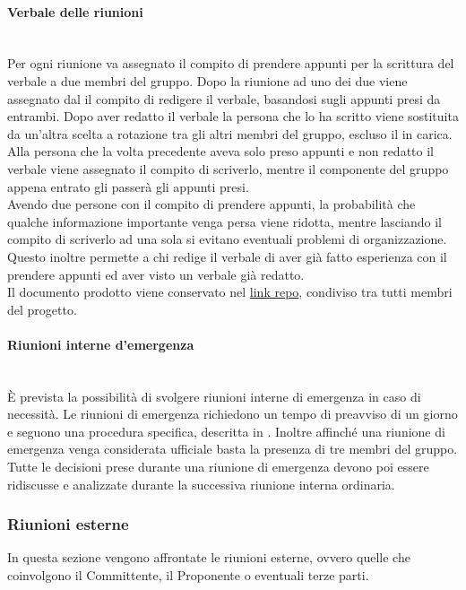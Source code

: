 \paragraph{Verbale delle riunioni}\label{sec:verbale_riunioni_interne}\mbox{}\\
Per ogni riunione va assegnato il compito di prendere appunti per la scrittura del verbale a due membri del gruppo. Dopo la riunione ad uno dei due viene assegnato dal \Responsabile{} il compito di redigere il verbale, basandosi sugli appunti presi da entrambi. 
Dopo aver redatto il verbale la persona che lo ha scritto viene sostituita da un’altra scelta a rotazione tra gli altri membri del gruppo, escluso il \Responsabile{} in carica. Alla persona che la volta precedente aveva solo preso appunti e non redatto il verbale viene assegnato il compito di scriverlo, mentre il componente del gruppo appena entrato gli passerà gli appunti presi.\\
Avendo due persone con il compito di prendere appunti, la probabilità che qualche informazione importante venga persa viene ridotta, mentre lasciando il compito di scriverlo ad una sola si evitano eventuali problemi di organizzazione.
Questo inoltre permette a chi redige il verbale di aver già fatto esperienza con il prendere appunti ed aver visto un verbale già redatto.\\
Il documento prodotto viene conservato nel  \url{link repo}, condiviso tra tutti membri del progetto.

\paragraph{Riunioni interne d'emergenza}\label{sec:riunioni_emergenza}\mbox{}\\
\`{E} prevista la possibilità di svolgere riunioni interne di emergenza in caso di necessità. Le riunioni di emergenza richiedono un tempo di preavviso di un giorno e seguono una procedura specifica, descritta in . Inoltre affinché una riunione di emergenza venga considerata ufficiale basta la presenza di tre membri del gruppo.\\
Tutte le decisioni prese durante una riunione di emergenza devono poi essere ridiscusse e analizzate durante la successiva riunione interna ordinaria.

\subsubsection{Riunioni esterne}
In questa sezione vengono affrontate le riunioni esterne, ovvero quelle che coinvolgono il Committente, il Proponente o eventuali terze parti.

